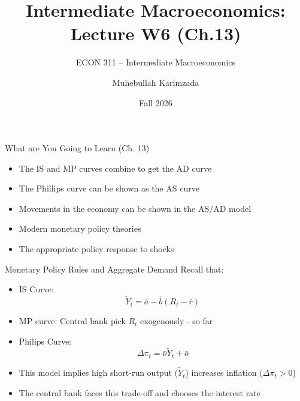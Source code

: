 \documentclass[aspectratio=1610]{beamer}
\title[Winter - Lecture 6] %
{Intermediate Macroeconomics: Lecture  W6 (Ch.13)}
\subtitle{ECON 311 -- Intermediate Macroeconomics}
\author{Muhebullah Karimzada}
\institute{School of Economics \\\ University of Northern British Columbia}
\date{Fall 2026}
\begin{document}
\begin{frame}[plain]
  \titlepage
\end{frame}

\begin{frame}[wide]{What are You Going to Learn (Ch. 13)}
	\begin{itemize}
		\item The IS and MP curves combine to get the AD curve
		\vspace{2mm}
		\item The Phillips curve can be shown as the AS curve
		\vspace{2mm}
		\item Movements in the economy can be shown in the AS/AD model
		\vspace{2mm}
		\item Modern monetary policy theories
		\vspace{2mm}
		\item The appropriate policy response to shocks
	\end{itemize}
\end{frame}

\begin{frame}[wide]{Monetary Policy Rules and Aggregate Demand}
	Recall that:
	\begin{itemize}
		\vspace{2mm}
		\item IS Curve:
		\[\tilde{Y}_t = \bar{a} - \bar{b} \left(R_t -\bar{r}\right) \]
		\vspace{2mm}
		\item MP curve: Central bank pick $R_t$ exogenously - so far
		\vspace{2mm}
		\item Philips Curve: 
		\[\Delta \pi_t = \bar{\nu} \tilde{Y}_t +\bar{o}\]
		\vspace{2mm}
		\item This model implies high short-run output ($\tilde{Y}_t$) increases inflation ($\Delta \pi_t>0$)
		\vspace{2mm}
		\item The central bank faces this trade-off and chooses the interest rate
	\end{itemize}
\end{frame}
\end{document}
